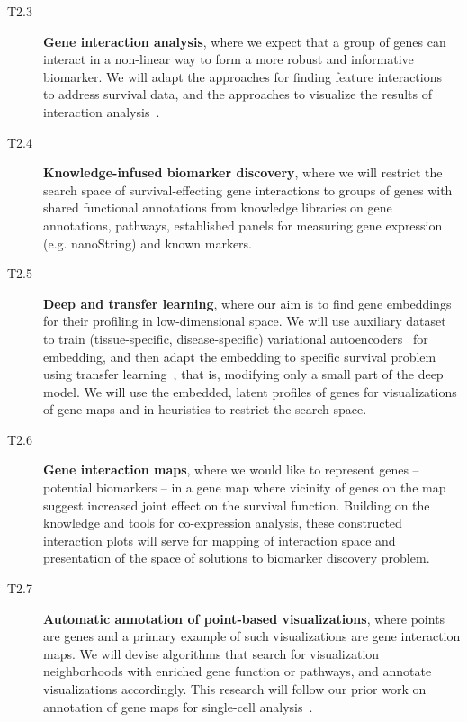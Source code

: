 \documentclass[11pt,a4paper]{article}
\renewcommand{\bold}{\textbf}
\begin{document}
\begin{description}
\begin{description}
		\item[T2.3] \bold{Gene interaction analysis}, where we expect that a group of genes can interact in a non-linear way to form a more robust and informative biomarker. We will adapt the approaches for finding feature interactions~\cite{} to address survival data, and the approaches to visualize the results of interaction analysis~\cite{}.
		\item[T2.4] \bold{Knowledge-infused biomarker discovery}, where we will restrict the search space of survival-effecting gene interactions to groups of genes with shared functional annotations from knowledge libraries on gene annotations, pathways, established panels for measuring gene expression (e.g. nanoString) and known markers.
 		\item[T2.5] \bold{Deep and transfer learning}, where our aim is to find gene embeddings for their profiling in low-dimensional space. We will use auxiliary dataset to train (tissue-specific, disease-specific) variational autoencoders~\cite{} for embedding, and then adapt the embedding to specific survival problem using transfer learning~\cite{}, that is, modifying only a small part of the deep model. We will use the embedded, latent profiles of genes for visualizations of gene maps and in heuristics to restrict the search space.
 		\item[T2.6] \bold{Gene interaction maps}, where we would like to represent genes -- potential biomarkers -- in a gene map where vicinity of genes on the map suggest increased joint effect on the survival function. Building on the knowledge and tools for co-expression analysis, these constructed interaction plots will serve for mapping of interaction space and presentation of the space of solutions to biomarker discovery problem.
		\item[T2.7] \bold{Automatic annotation of point-based visualizations}, where points are genes and a primary example of such visualizations are gene interaction maps. We will devise algorithms that search for visualization neighborhoods with enriched gene function or pathways, and annotate visualizations accordingly. This research will follow our prior work on annotation of gene maps for single-cell analysis~\cite{}.
	\end{description}

\end{description}
\end{document}
